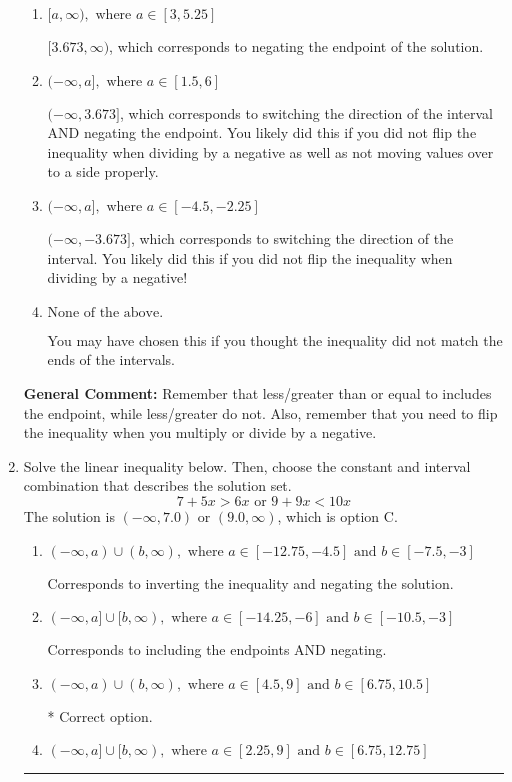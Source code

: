 \documentclass{extbook}[14pt]
\newcommand{\litem}[1]{\item #1

\rule{\textwidth}{0.4pt}}
\begin{document}
\begin{enumerate}
{\begin{enumerate}[label=\Alph*.]
* $[-3.673, \infty)$, which is the correct option.
\item \( [a, \infty), \text{ where } a \in [3, 5.25] \)

 $[3.673, \infty)$, which corresponds to negating the endpoint of the solution.
\item \( (-\infty, a], \text{ where } a \in [1.5, 6] \)

 $(-\infty, 3.673]$, which corresponds to switching the direction of the interval AND negating the endpoint. You likely did this if you did not flip the inequality when dividing by a negative as well as not moving values over to a side properly.
\item \( (-\infty, a], \text{ where } a \in [-4.5, -2.25] \)

 $(-\infty, -3.673]$, which corresponds to switching the direction of the interval. You likely did this if you did not flip the inequality when dividing by a negative!
\item \( \text{None of the above}. \)

You may have chosen this if you thought the inequality did not match the ends of the intervals.
\end{enumerate}

\textbf{General Comment:} Remember that less/greater than or equal to includes the endpoint, while less/greater do not. Also, remember that you need to flip the inequality when you multiply or divide by a negative.
}
\litem{
Solve the linear inequality below. Then, choose the constant and interval combination that describes the solution set.
\[ 7 + 5 x > 6 x \text{ or } 9 + 9 x < 10 x \]The solution is \( (-\infty, 7.0) \text{ or } (9.0, \infty) \), which is option C.\begin{enumerate}[label=\Alph*.]
\item \( (-\infty, a) \cup (b, \infty), \text{ where } a \in [-12.75, -4.5] \text{ and } b \in [-7.5, -3] \)

Corresponds to inverting the inequality and negating the solution.
\item \( (-\infty, a] \cup [b, \infty), \text{ where } a \in [-14.25, -6] \text{ and } b \in [-10.5, -3] \)

Corresponds to including the endpoints AND negating.
\item \( (-\infty, a) \cup (b, \infty), \text{ where } a \in [4.5, 9] \text{ and } b \in [6.75, 10.5] \)

 * Correct option.
\item \( (-\infty, a] \cup [b, \infty), \text{ where } a \in [2.25, 9] \text{ and } b \in [6.75, 12.75] \)


\end{enumerate}}
\end{enumerate}
\end{document}
